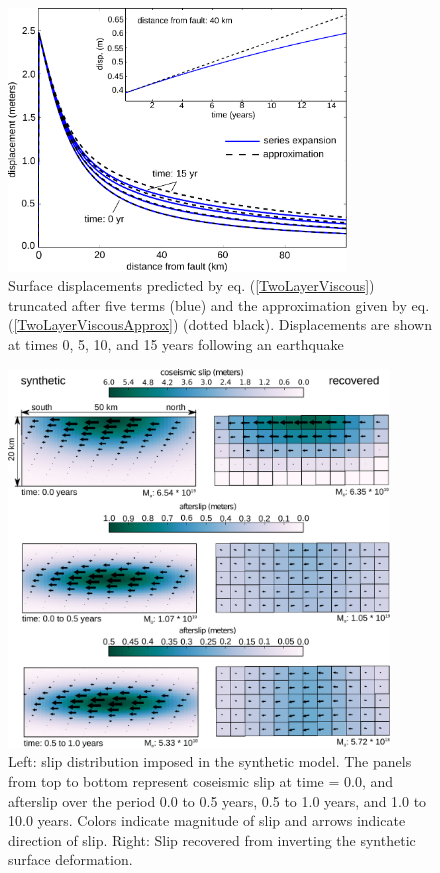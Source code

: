 \documentclass[extra]{gji}
\begin{document}
\begin{figure}[h!]\label{figure1}
  \centering
  \includegraphics[width=0.8\textwidth]{FinalFigures/Figure1.pdf}
  \caption{Surface displacements predicted by
    eq. (\ref{TwoLayerViscous}) truncated after five terms (blue) and
    the approximation given by eq. (\ref{TwoLayerViscousApprox})
    (dotted black).  Displacements are shown at times 0, 5, 10, and 15
    years following an earthquake}
  \label{figure 1}
\end{figure}

\begin{figure}[h!]\label{figure2}
  \centering
  \includegraphics[width=0.9\textwidth]{FinalFigures/Figure2.pdf}
  \caption{Left: slip distribution imposed in the synthetic model.
    The panels from top to bottom represent coseismic slip at time =
    0.0, and afterslip over the period 0.0 to 0.5 years, 0.5 to 1.0
    years, and 1.0 to 10.0 years.  Colors indicate magnitude of slip
    and arrows indicate direction of slip.  Right: Slip recovered from
    inverting the synthetic surface deformation.}
  \label{figure 2}
\end{figure}
\end{document}
